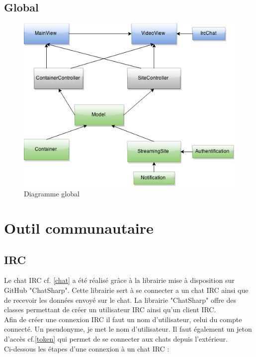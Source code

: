 \documentclass[11pt]{report} %
\begin{document}
			
	\newpage
	\subsection{Global}
		\begin{figure}[h]
			\center
			\includegraphics[width=1\textwidth]{../img/Model.png}
			\caption{Diagramme global}
			\label{Global}
		\end{figure}
			
	\newpage
	\section{Outil communautaire}
		\subsection{IRC}
		Le chat IRC cf. \ref{chat} a été réalisé grâce à la librairie mise à disposition sur GitHub "ChatSharp". Cette librairie sert à se connecter a un chat IRC ainsi que de recevoir les données envoyé sur le chat.
		La librairie "ChatSharp" offre des classes permettant de créer un utilisateur IRC ainsi qu'un client IRC. \\
		
		Afin de créer une connexion IRC il faut un nom d'utilisateur, celui du compte connecté. Un pseudonyme, je met le nom d'utilisateur. Il faut également un jeton d'accès cf.\ref{token} qui permet de se connecter aux chats depuis l'extérieur.\\
		Ci-dessous les étapes d'une connexion à un chat IRC :
		
\end{document}
